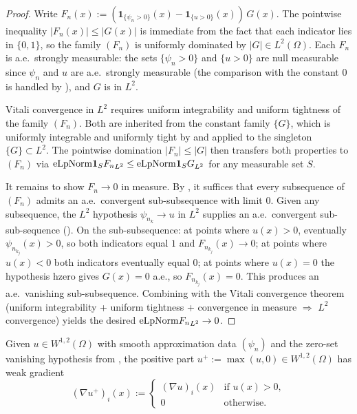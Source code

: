 \begin{proof}
\leanok
{}

Write $F_n(x) := (\mathbf{1}_{\{\psi_n > 0\}}(x) - \mathbf{1}_{\{u > 0\}}(x))\,G(x)$.
The pointwise inequality $|F_n(x)| \le |G(x)|$ is immediate from the fact that
each indicator lies in $\{0,1\}$, so the family $(F_n)$ is uniformly dominated
by $|G| \in L^2(\Omega)$. Each $F_n$ is a.e.\ strongly measurable: the sets
$\{\psi_n > 0\}$ and $\{u > 0\}$ are null measurable since $\psi_n$ and $u$
are a.e.\ strongly measurable (the comparison with the constant $0$ is
handled by ), and $G$
is in $L^2$.

Vitali convergence in $L^2$ requires uniform integrability and uniform
tightness of the family $(F_n)$. Both are inherited from the constant family
$\{G\}$, which is uniformly integrable and uniformly tight by
 and
 applied to the singleton
$\{G\} \subset L^2$. The pointwise domination $|F_n| \le |G|$ then transfers
both properties to $(F_n)$ via $\mathrm{eLpNorm}{\mathbf{1}_S F_n}_{L^2} \le
\mathrm{eLpNorm}{\mathbf{1}_S G}_{L^2}$ for any measurable set $S$.

It remains to show $F_n \to 0$ in measure. By ,
it suffices that every subsequence of $(F_n)$ admits an a.e.\ convergent
sub-subsequence with limit $0$. Given any subsequence, the $L^2$ hypothesis
$\psi_{n_k} \to u$ in $L^2$ supplies an a.e.\ convergent sub-sub-sequence
(). On the
sub-subsequence: at points where $u(x) > 0$, eventually $\psi_{n_{k_j}}(x) > 0$,
so both indicators equal $1$ and $F_{n_{k_j}}(x) \to 0$; at points where
$u(x) < 0$ both indicators eventually equal $0$; at points where $u(x) = 0$
the hypothesis hzero gives $G(x) = 0$ a.e., so $F_{n_{k_j}}(x) = 0$.
This produces an a.e.\ vanishing sub-subsequence. Combining with the Vitali
convergence theorem (uniform integrability + uniform tightness +
convergence in measure $\Rightarrow$ $L^2$ convergence) yields the desired
$\mathrm{eLpNorm}{F_n}_{L^2} \to 0$.
\end{proof}

\begin{definition}
\label{def:MemW1pWitness_posPart_of_aux}
\leanok
{}
Given $u \in W^{1,2}(\Omega)$ with smooth approximation data $(\psi_n)$ and
the zero-set vanishing hypothesis from
, the positive part
$u^+ := \max(u,0) \in W^{1,2}(\Omega)$ has weak gradient
\begin{equation*}
(\nabla u^+)_i(x) := \begin{cases}
(\nabla u)_i(x) & \text{if } u(x) > 0, \\
0 & \text{otherwise}.
\end{cases}
\end{equation*}
\end{definition}

